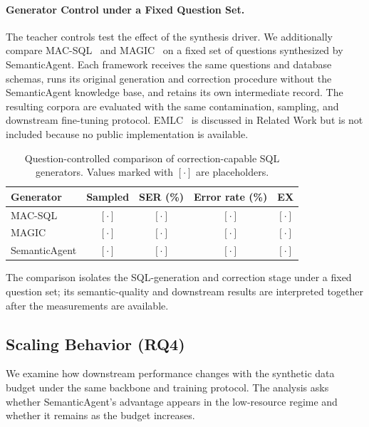 \documentclass[letterpaper,journal]{IEEEtran}
\begin{document}
\paragraph{Generator Control under a Fixed Question Set.}
\label{subsec:generator-control}

The teacher controls test the effect of the synthesis driver. We additionally compare MAC-SQL~\cite{wang2025macsql} and MAGIC~\cite{askari2025magic} on a fixed set of questions synthesized by SemanticAgent. Each framework receives the same questions and database schemas, runs its original generation and correction procedure without the SemanticAgent knowledge base, and retains its own intermediate record. The resulting corpora are evaluated with the same contamination, sampling, and downstream fine-tuning protocol. EMLC~\cite{lei2026emlc} is discussed in Related Work but is not included because no public implementation is available.

\begin{table}[!t]
\centering
\caption{Question-controlled comparison of correction-capable SQL generators. Values marked with $[\cdot]$ are placeholders.}
\label{tab:generator-control}
\small
\setlength{\tabcolsep}{4pt}
\begin{tabular}{lcccc}
\toprule
\textbf{Generator} & \textbf{Sampled} & \textbf{SER (\%)} & \textbf{Error rate (\%)} & \textbf{EX} \\
\midrule
MAC-SQL & $[\cdot]$ & $[\cdot]$ & $[\cdot]$ & $[\cdot]$ \\
MAGIC & $[\cdot]$ & $[\cdot]$ & $[\cdot]$ & $[\cdot]$ \\
SemanticAgent & $[\cdot]$ & $[\cdot]$ & $[\cdot]$ & $[\cdot]$ \\
\bottomrule
\end{tabular}
\end{table}

The comparison isolates the SQL-generation and correction stage under a fixed question set; its semantic-quality and downstream results are interpreted together after the measurements are available.

\subsection{Scaling Behavior (RQ4)}

We examine how downstream performance changes with the synthetic data budget under the same backbone and training protocol. The analysis asks whether SemanticAgent's advantage appears in the low-resource regime and whether it remains as the budget increases.
\end{document}
